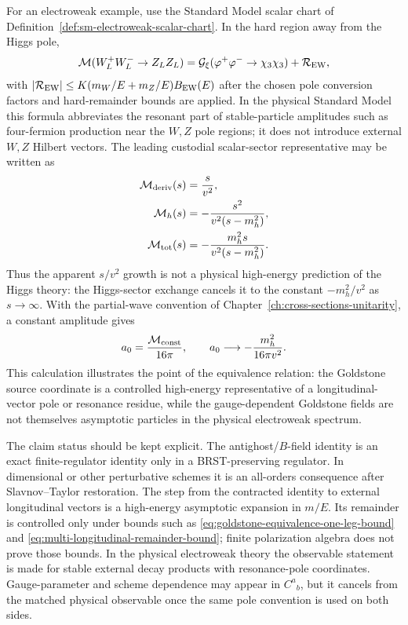 For an electroweak example, use the Standard Model scalar chart of
Definition~\ref{def:sm-electroweak-scalar-chart}.  In the hard region away from
the Higgs pole,
\begin{equation}
  \mathcal M(W_L^+W_L^-\to Z_LZ_L)
  =
  \mathcal G_\xi(\varphi^+\varphi^-\to\chi_3\chi_3)
  +
  \mathcal R_{\rm EW},
  \label{eq:wlwl-goldstone-scattering-equivalence}
\end{equation}
with \(|\mathcal R_{\rm EW}|\le K(m_W/E+m_Z/E)B_{\rm EW}(E)\) after the chosen
pole conversion factors and hard-remainder bounds are applied.  In the
physical Standard Model this formula abbreviates the resonant part of
stable-particle amplitudes such as four-fermion production near the \(W,Z\)
pole regions; it does not introduce external \(W,Z\) Hilbert vectors.  The
leading custodial scalar-sector representative may be written as
\begin{align}
  \mathcal M_{\rm deriv}(s) &= \frac{s}{v^2}, \nonumber\\
  \mathcal M_h(s) &= -\frac{s^2}{v^2(s-m_h^2)}, \nonumber\\
  \mathcal M_{\rm tot}(s) &=
  -\frac{m_h^2s}{v^2(s-m_h^2)} .
  \label{eq:ww-higgs-cancellation-amplitude}
\end{align}
Thus the apparent \(s/v^2\) growth is not a physical high-energy prediction of
the Higgs theory: the Higgs-sector exchange cancels it to the constant
\(-m_h^2/v^2\) as \(s\to\infty\).  With the partial-wave convention of
Chapter~\ref{ch:cross-sections-unitarity}, a constant amplitude gives
\begin{equation}
  a_0=\frac{\mathcal M_{\rm const}}{16\pi},
  \qquad
  a_0\longrightarrow -\frac{m_h^2}{16\pi v^2}.
  \label{eq:ww-higgs-cancellation-a0}
\end{equation}
This calculation illustrates the point of the equivalence relation: the
Goldstone source coordinate is a controlled high-energy representative of a
longitudinal-vector pole or resonance residue, while the gauge-dependent
Goldstone fields are not themselves asymptotic particles in the physical
electroweak spectrum.

The claim status should be kept explicit.  The antighost/\(B\)-field identity
is an exact finite-regulator identity only in a BRST-preserving regulator.  In
dimensional or other perturbative schemes it is an all-orders consequence after
Slavnov--Taylor restoration.  The step from the contracted identity to
external longitudinal vectors is a high-energy asymptotic expansion in \(m/E\).
Its remainder is controlled only under bounds such as
\eqref{eq:goldstone-equivalence-one-leg-bound} and
\eqref{eq:multi-longitudinal-remainder-bound}; finite polarization algebra does
not prove those bounds.  In the physical electroweak theory the observable
statement is made for stable external decay products with resonance-pole
coordinates.
Gauge-parameter and scheme dependence may appear in \(C^a{}_{b}\), but it
cancels from the matched physical observable once the same pole convention is
used on both sides.

